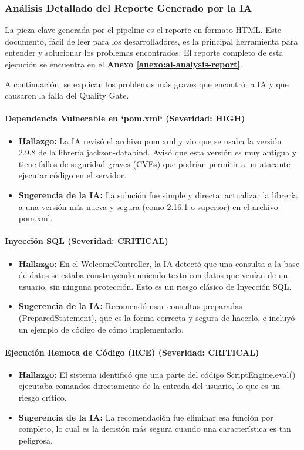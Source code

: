 \subsubsection{Análisis Detallado del Reporte Generado por la IA}
La pieza clave generada por el pipeline es el reporte en formato HTML. Este documento, fácil de leer para los desarrolladores, es la principal herramienta para entender y solucionar los problemas encontrados. El reporte completo de esta ejecución se encuentra en el \textbf{Anexo \ref{anexo:ai-analysis-report}}.

A continuación, se explican los problemas más graves que encontró la IA y que causaron la falla del Quality Gate.

\paragraph{Dependencia Vulnerable en `pom.xml` (Severidad: HIGH)}
\begin{itemize}
    \item \textbf{Hallazgo:} La IA revisó el archivo pom.xml y vio que se usaba la versión 2.9.8 de la librería jackson-databind. Avisó que esta versión es muy antigua y tiene fallos de seguridad graves (CVEs) que podrían permitir a un atacante ejecutar código en el servidor.
    \item \textbf{Sugerencia de la IA:} La solución fue simple y directa: actualizar la librería a una versión más nueva y segura (como 2.16.1 o superior) en el archivo pom.xml.
\end{itemize}

\paragraph{Inyección SQL (Severidad: CRITICAL)}
\begin{itemize}
    \item \textbf{Hallazgo:} En el WelcomeController, la IA detectó que una consulta a la base de datos se estaba construyendo uniendo texto con datos que venían de un usuario, sin ninguna protección. Esto es un riesgo clásico de Inyección SQL.
    \item \textbf{Sugerencia de la IA:} Recomendó usar consultas preparadas (PreparedStatement), que es la forma correcta y segura de hacerlo, e incluyó un ejemplo de código de cómo implementarlo.
\end{itemize}

\paragraph{Ejecución Remota de Código (RCE) (Severidad: CRITICAL)}
\begin{itemize}
    \item \textbf{Hallazgo:} El sistema identificó que una parte del código ScriptEngine.eval() ejecutaba comandos directamente de la entrada del usuario, lo que es un riesgo crítico.
    \item \textbf{Sugerencia de la IA:} La recomendación fue eliminar esa función por completo, lo cual es la decisión más segura cuando una característica es tan peligrosa.
\end{itemize}

